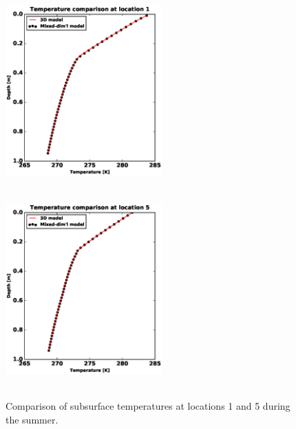 \documentclass[review]{elsarticle}
\begin{document}
\begin{figure}[!htpb]
\centering
\includegraphics[height = 7.5cm, width=6cm]{figures/comparison/regular/ss-temp/comp-temp-loc1-cycle0020.eps}
\includegraphics[height = 7.5cm, width=6cm]{figures/comparison/regular/ss-temp/comp-temp-loc5-cycle0020.eps}
\caption{Comparison of subsurface temperatures at locations 1 and 5 during the summer.}
\label{ss-temp-comp}
\end{figure}
\end{document}
